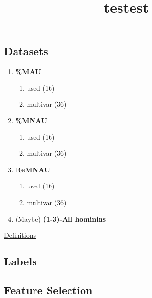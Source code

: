 \documentclass[
  letterpaper,
  DIV=11,
  numbers=noendperiod]{scrartcl}
\title{testest}
\author{}
\date{}
\providecommand{\tightlist}{%
  \setlength{\itemsep}{0pt}\setlength{\parskip}{0pt}}\usepackage{longtable,booktabs,array}
\begin{document}
\maketitle
\ifdefined\Shaded\renewenvironment{Shaded}{\begin{tcolorbox}[enhanced, borderline west={3pt}{0pt}{shadecolor}, boxrule=0pt, frame hidden, sharp corners, interior hidden, breakable]}{\end{tcolorbox}}\fi

\hypertarget{datasets}{%
\subsection{Datasets}\label{datasets}}

\begin{enumerate}
\def\labelenumi{\arabic{enumi}.}
\tightlist
\item
  \textbf{\%MAU}

  \begin{enumerate}
  \def\labelenumii{\arabic{enumii}.}
  \tightlist
  \item
    used (16)
  \item
    multivar (36)
  \end{enumerate}
\item
  \textbf{\%MNAU}

  \begin{enumerate}
  \def\labelenumii{\arabic{enumii}.}
  \tightlist
  \item
    used (16)
  \item
    multivar (36)
  \end{enumerate}
\item
  \textbf{ReMNAU}

  \begin{enumerate}
  \def\labelenumii{\arabic{enumii}.}
  \tightlist
  \item
    used (16)
  \item
    multivar (36)
  \end{enumerate}
\item
  (Maybe) \textbf{(1-3)-All hominins}
\end{enumerate}

\protect\hyperlink{definitions}{Definitions}

\hypertarget{labels}{%
\subsection{Labels}\label{labels}}

\hypertarget{feature-selection}{%
\subsection{Feature Selection}\label{feature-selection}}
\end{document}
